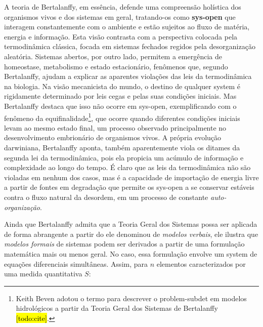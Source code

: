 \documentclass[./main.tex]{subfiles}
\begin{document}
\par A \gls{teoria} de Bertalanffy, em essência, defende uma compreensão holística dos organismos vivos e dos sistemas em geral, tratando-os como \textbf{\gls{sys-open}} que interagem constantemente com o ambiente e estão sujeitos ao fluxo de matéria, energia e informação. Esta visão contrasta com a perspectiva colocada pela termodinâmica clássica, focada em sistemas fechados regidos pela desorganização aleatória. Sistemas abertos, por outro lado, permitem a emergência de homeostase, metabolismo e estado estacionário, fenômenos que, segundo Bertalanffy, ajudam a explicar as aparentes violações das leis da termodinâmica na biologia. Na visão mecanicista do mundo, o destino de qualquer \gls{system} é rigidamente determinado por leis cegas e pelas suas condições iniciais. Mas Bertalanffy destaca que isso não ocorre em \gls{sys-open}, exemplificando com o fenômeno da equifinalidade\footnote{Keith Beven adotou o termo  para descrever o \gls{problem-subdet} em modelos hidrológicos a partir da Teoria Geral dos Sistemas de Bertalanffy \hl{[todo:cite]}.}, que ocorre quando diferentes condições iniciais levam ao mesmo estado final, um processo observado principalmente no desenvolvimento embrionário de organismos vivos. A própria evolução darwiniana, Bertalanffy aponta, também aparentemente viola os ditames da segunda lei da termodinâmica, pois ela propicia um acúmulo de informação e complexidade ao longo do tempo. É claro que as leis da termodinâmica não são violadas em nenhum dos casos, mas é a capacidade de importação de energia livre a partir de fontes em degradação que permite os \gls{sys-open} a se conservar estáveis contra o fluxo natural da desordem, em um processo de constante \textit{auto-organização}.

\par Ainda que Bertalanffy admita que a Teoria Geral dos Sistemas possa ser aplicada de forma abrangente a partir do ele denominou de \textit{modelos verbais}, ele ilustra que \textit{modelos formais} de sistemas podem ser derivados a partir de uma formulação matemática mais ou menos geral. No caso, essa formulação envolve um \gls{system} de equações diferenciais simultâneas. Assim, para $n$ elementos caracterizados por uma medida quantitativa $S$:
\end{document}
